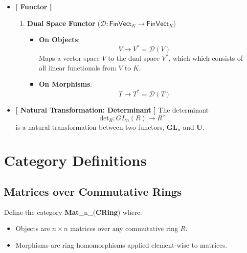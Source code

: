 \begin{example}
\begin{itemize}
	\item[] \textbf{[ Functor ]}
	\begin{enumerate}
		\item \textbf{Dual Space Functor} ($\mathcal{D}:\mathsf{FinVect}_K\to\mathsf{FinVect}_K$)
		\begin{itemize}
			\item \textbf{On Objects}: \[
			V\mapsto V^*=\mathcal{D}(V)
			\] Maps a vector space $V$ to the dual space $V^*$, which  which consists of all linear functionals from $V$ to $K$.
			\item \textbf{On Morphisms}:\[
			T\mapsto T^*=\mathcal{D}(T)
			\]
		\end{itemize}
	\end{enumerate}
	\item \textbf{[ Natural Transformation: Determinant ]} The determinant \[
	\text{det}_R:GL_n(R)\to R^{\times}
	\] is a natural transformation between two functors, $\mathbf{GL}_n$ and $\mathbf{U}$.
\end{itemize}
\end{example}

\newpage
\section{Category Definitions}
\subsection{Matrices over Commutative Rings}
Define the category \textbf{Mat}\_n\_(\textbf{CRing}) where:
\begin{itemize}
	\item Objects are \(n \times n\) matrices over any commutative ring \(R\).
	\item Morphisms are ring homomorphisms applied element-wise to matrices.
\end{itemize}

